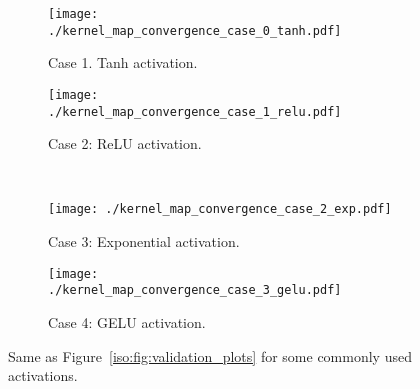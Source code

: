 \begin{figure}[ht!]
    \centering
    \begin{subfigure}[b]{0.7\textwidth}
        \centering
        \texttt{[image: ./kernel\_map\_convergence\_case\_0\_tanh.pdf]}
        \caption{\small Case 1. Tanh activation.}
    \end{subfigure}
    \hfill
    \begin{subfigure}[b]{0.7\textwidth}
        \centering
        \texttt{[image: ./kernel\_map\_convergence\_case\_1\_relu.pdf]}
        \caption{\small Case 2: ReLU activation.}
    \end{subfigure}
    \\
    \begin{subfigure}[b]{0.7\textwidth}
        \centering
        \texttt{[image: ./kernel\_map\_convergence\_case\_2\_exp.pdf]}
        \caption{\small Case 3: Exponential activation.} 
    \end{subfigure}
    \hfill
    \begin{subfigure}[b]{0.7\textwidth}
        \centering
        \texttt{[image: ./kernel\_map\_convergence\_case\_3\_gelu.pdf]}
        \caption{\small Case 4: GELU activation.}
    \end{subfigure}
    \caption{\small Same as Figure~\ref{iso:fig:validation_plots} for some commonly used activations. }
    \label{iso:fig:validation_plots_real_activations}
\end{figure}





